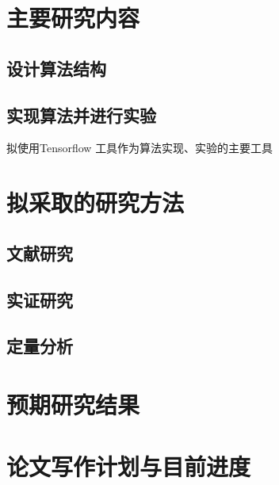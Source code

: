 
\chapter{主要研究内容}
\section{设计算法结构}
\section{实现算法并进行实验}
拟使用Tensorflow
\supercite{abadi2016tensorflow}
工具作为算法实现、实验的主要工具

\chapter{拟采取的研究方法}
\section{文献研究}
\section{实证研究}
\section{定量分析}

\chapter{预期研究结果}
\chapter{论文写作计划与目前进度}

